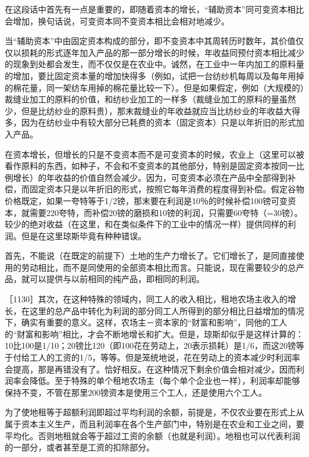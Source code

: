 在这段话中首先有一点是重要的，即随着资本的增长，“辅助资本”同可变资本相比会增加，换句话说，可变资本同不变资本相比会相对地减少。

当“辅助资本”中由固定资本构成的部分，即不变资本中其周转历时数年，其价值仅仅以损耗的形式逐年加入产品的那一部分增长的时候，年收益同预付资本相比减少的现象到处都会发生，而不仅仅是在农业中。诚然，在工业中一年内加工的原料量的增加，要比固定资本量的增加快得多（例如，试把一台纺纱机每周以及每年用掉的棉花量，同一架纺车用掉的棉花量比较一下）。但是如果假定，例如（大规模的）裁缝业加工的原料的价值，和纺纱业加工的一样多（裁缝业加工的原料的量虽然少，但是比纺纱业的原料贵），那末裁缝业的年收益就应当比纺纱业的年收益大得多，因为在纺纱业中有较大部分已耗费的资本（固定资本）只是以年折旧的形式加入产品。

在资本增长，但增长的只是不变资本而不是可变资本的时候，农业上（这里可以被看作原料的东西，如种子，不会和不变资本的其他部分，特别是固定资本按同一比例增长）的年收益的价值自然会减少。因为，可变资本必须在产品中全部得到补偿，而固定资本只是以年折旧的形式，按照它每年消费的程度得到补偿。假定谷物价格既定，如果一夸特等于1/2镑，那末要在利润是10％的时候补偿100镑可变资本，就需要220夸特，而补偿20镑的磨损和10镑的利润，只需要60夸特（=30镑）。较少的绝对收益（在这里，和在类似条件下的工业中的情况一样）提供同样的利润。但是在这里琼斯毕竟有种种错误。

首先，不能说（在既定的前提下）土地的生产力增长了。它们增长了，是同直接使用的劳动相比，而不是同使用的全部资本相比而言。只能说，现在需要较少的总产品，就可以提供与以前相同的纯产品，即相同的利润。

［1130］其次，在这种特殊的领域内，同工人的收入相比，租地农场主收入的增长，在这里的总产品中转化为利润的部分同工人所得到的部分相比日益增加的情况下，确实有重要的意义。这样，农场主－资本家的“财富和影响”，同他的工人的“财富和影响”相比，才会不断地增长和扩大。但是，琼斯却似乎是这样计算的：10比100是1/10；20镑比120（即100花在劳动上，20表示损耗）是1/6，而这20镑等于付给工人的工资的1/5，等等。但是笼统地说，花在劳动上的资本减少时利润率会提高，那是再错没有了。恰好相反。在这种情况下剩余价值会相对减少，因而利润率会降低。至于特殊的单个租地农场主（每个单个企业也一样），利润率却能够保持不变，不管在那里200镑资本是使用三个工人，还是使用六个工人。

为了使地租等于超额利润即超过平均利润的余额，前提是，不仅农业要在形式上从属于资本主义生产，而且利润率在各个生产部门中，特别是在农业和工业之间，要平均化。否则地租就会等于超过工资的余额（也就是利润）。地租也可以代表利润的一部分，或者甚至是工资的扣除部分。


